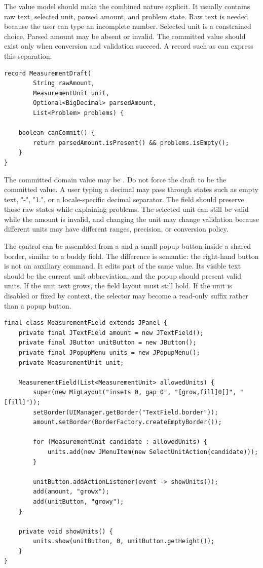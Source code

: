 The value model should make the combined nature explicit. It usually contains raw text,
selected unit, parsed amount, and problem state. Raw text is needed because the user can
type an incomplete number. Selected unit is a constrained choice. Parsed amount may be
absent or invalid. The committed value should exist only when conversion and validation
succeed. A record such as
 can express this separation.

\begin{lstlisting}[caption={A unit field model keeps raw text and selected unit together.}]
record MeasurementDraft(
        String rawAmount,
        MeasurementUnit unit,
        Optional<BigDecimal> parsedAmount,
        List<Problem> problems) {

    boolean canCommit() {
        return parsedAmount.isPresent() && problems.isEmpty();
    }
}
\end{lstlisting}

The committed domain value may be
. Do not force the draft to be the committed value. A user typing
a decimal may pass through states such as empty text, "-", "1.", or a locale-specific
decimal separator. The field should preserve those raw states while explaining problems.
The selected unit can still be valid while the amount is invalid, and changing the unit
may change validation because different units may have different ranges, precision, or
conversion policy.

The control can be assembled from a
 and a small popup
button inside a shared border, similar to a buddy field. The difference is semantic: the
right-hand button is not an auxiliary command. It edits part of the same value. Its
visible text should be the current unit abbreviation, and the popup should present valid
units. If the unit text grows, the field layout must still hold. If the unit is disabled
or fixed by context, the selector may become a read-only suffix rather than a popup
button.

\begin{lstlisting}[caption={A unit field wrapper treats unit selection as field state.}]
final class MeasurementField extends JPanel {
    private final JTextField amount = new JTextField();
    private final JButton unitButton = new JButton();
    private final JPopupMenu units = new JPopupMenu();
    private MeasurementUnit unit;

    MeasurementField(List<MeasurementUnit> allowedUnits) {
        super(new MigLayout("insets 0, gap 0", "[grow,fill]0[]", "[fill]"));
        setBorder(UIManager.getBorder("TextField.border"));
        amount.setBorder(BorderFactory.createEmptyBorder());

        for (MeasurementUnit candidate : allowedUnits) {
            units.add(new JMenuItem(new SelectUnitAction(candidate)));
        }

        unitButton.addActionListener(event -> showUnits());
        add(amount, "growx");
        add(unitButton, "growy");
    }

    private void showUnits() {
        units.show(unitButton, 0, unitButton.getHeight());
    }
}
\end{lstlisting}

